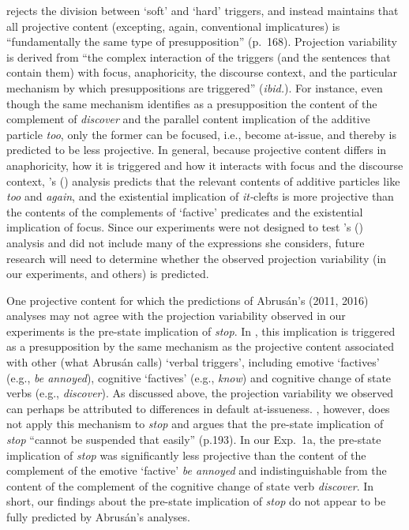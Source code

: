 \documentclass[11pt,fleqn]{article}
\newcommand{\6}{\mbox{$[\hspace*{-.6mm}[$}}
\newcommand{\9}{\mbox{$]\hspace*{-.6mm}]$}}
\newcommand{\citetpos}[1]{\citeauthor{#1}'s (\citeyear{#1})}
\begin{document}
\citet{abrusan2016} rejects the division between `soft' and `hard' triggers, and instead maintains that all projective content (excepting, again, conventional implicatures) is ``fundamentally the same type of presupposition'' (p.\ 168). Projection variability is derived from ``the complex interaction of the triggers (and the sentences that contain them) with focus, anaphoricity, the discourse context, and the particular mechanism by which presuppositions are triggered'' ({\em ibid.}). For instance, even though the same mechanism identifies as a presupposition the content of the complement of {\em discover} and the parallel content implication of the additive particle {\em too}, only the former can be focused, i.e., become at-issue, and thereby is predicted to be less projective. In general, because projective content differs in anaphoricity, how it is triggered and how it interacts with focus and the discourse context, \citetpos{abrusan2016} analysis predicts that the relevant contents of additive particles like {\em too} and {\em again}, and the existential implication of {\em it-}clefts is more projective than the contents of the complements of `factive' predicates and the existential implication of focus. Since our experiments were not designed to test \citetpos{abrusan2016} analysis and did not include many of the expressions she considers, future research will need to determine whether the observed projection variability (in our experiments, and others) is predicted.

One projective content for which the predictions of Abrus\'an's (2011, 2016) analyses may not agree with the projection variability observed in our experiments is the pre-state implication of {\em stop}. In \citealt{abrusan2011}, this implication is triggered as a presupposition by the same mechanism as the projective content associated with other (what Abrus\'an calls) `verbal triggers', including emotive `factives' (e.g., {\em be annoyed}), cognitive `factives' (e.g., {\em know}) and cognitive change of state verbs (e.g., {\em discover}). As discussed above, the projection variability we observed can perhaps be attributed to differences in default at-issueness.  \citet{abrusan2016}, however, does not apply this mechanism to {\em stop} and   argues that the pre-state implication of {\em stop} ``cannot be suspended that easily'' (p.193). In our Exp.~1a, the pre-state implication of {\em stop} was significantly less projective than the content of the complement of the emotive `factive' {\em be annoyed} and indistinguishable from the content of the complement of the cognitive change of state verb {\em discover}. In short, our findings about the pre-state implication of {\em stop} do not appear to be fully predicted by Abrus\'an's analyses. 
\end{document}
